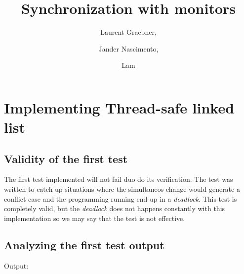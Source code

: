 \documentclass{article}
\begin{document}
\title{Synchronization with monitors}

\author{Laurent Graebner,
\and Jander Nascimento, 
\and Lam }

\maketitle

\tableofcontents

\section{Implementing Thread-safe linked list}          

	\subsection{Validity of the first test}

		The first test implemented will not fail duo do its verification. The test was written
		to catch up situations where the simultaneos change would generate a conflict case and
		the programming running end up in a \textit{deadlock}.
		This test is completely valid, but the \textit{deadlock} does not happens constantly with 
		this implementation so we may say that the test is not effective.

	\subsection{Analyzing the first test output}

		Output:
\end{document}
